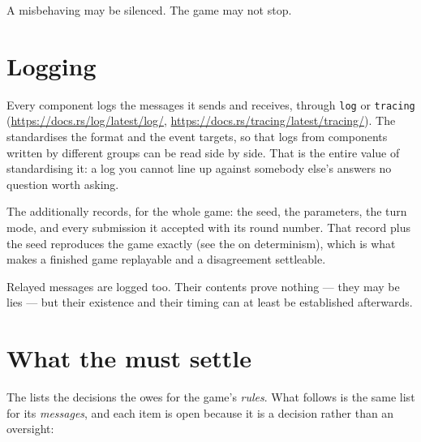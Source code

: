 \documentclass{article}
\begin{document}
A misbehaving \ship{} may be silenced. The game may not stop.

\newpage
\section{Logging}
\label{proto:logging}

Every component logs the messages it sends and receives, through \texttt{log} or \texttt{tracing}
(\url{https://docs.rs/log/latest/log/}, \url{https://docs.rs/tracing/latest/tracing/}). The \WG{}
standardises the format and the event targets, so that logs from components written by different
groups can be read side by side. That is the entire value of standardising it: a log you cannot
line up against somebody else's answers no question worth asking.

The \admiralty{} additionally records, for the whole game: the seed, the parameters, the turn mode,
and every submission it accepted with its round number. That record plus the seed reproduces the
game exactly (see the \MD{} on determinism), which is what makes a finished game replayable and a
disagreement settleable.

Relayed messages are logged too. Their contents prove nothing --- they may be lies --- but their
existence and their timing can at least be established afterwards.

\newpage
\section{What the \WG{} must settle}
\label{proto:todo}

The \MD{} lists the decisions the \WG{} owes for the game's \emph{rules}. What follows is the same
list for its \emph{messages}, and each item is open because it is a decision rather than an
oversight:
\end{document}
